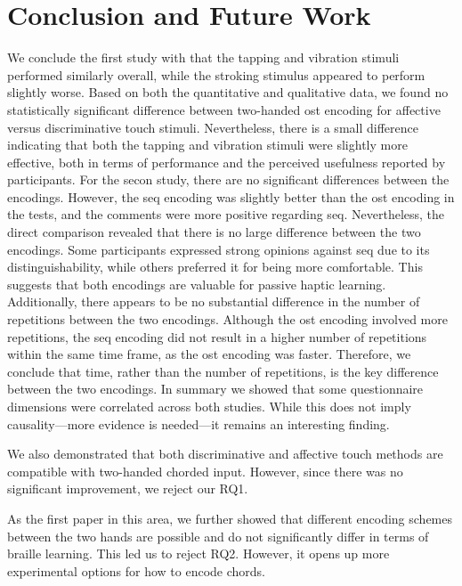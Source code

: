 \chapter{Conclusion and Future Work}
\label{ch:conclusion}

We conclude the first study with that the tapping and vibration stimuli performed similarly overall, while the stroking stimulus appeared to perform slightly worse. Based on both the quantitative and qualitative data, we found no statistically significant difference between two-handed \gls{ost} encoding for affective versus discriminative touch stimuli. Nevertheless, there is a small difference indicating that both the tapping and vibration stimuli were slightly more effective, both in terms of performance and the perceived usefulness reported by participants.
For the secon study, there are no significant differences between the encodings. However, the \gls{seq} encoding was slightly better than the \gls{ost} encoding in the tests, and the comments were more positive regarding \gls{seq}. Nevertheless, the direct comparison revealed that there is no large difference between the two encodings. Some participants expressed strong opinions against \gls{seq} due to its distinguishability, while others preferred it for being more comfortable. This suggests that both encodings are valuable for passive haptic learning. Additionally, there appears to be no substantial difference in the number of repetitions between the two encodings. Although the \gls{ost} encoding involved more repetitions, the \gls{seq} encoding did not result in a higher number of repetitions within the same time frame, as the \gls{ost} encoding was faster. Therefore, we conclude that time, rather than the number of repetitions, is the key difference between the two encodings.
In summary we showed that some questionnaire dimensions were correlated across both studies. While this does not imply causality—more evidence is needed—it remains an interesting finding.

We also demonstrated that both discriminative and affective touch methods are compatible with two-handed chorded input. However, since there was no significant improvement, we reject our RQ1.

As the first paper in this area, we further showed that different encoding schemes between the two hands are possible and do not significantly differ in terms of braille learning. This led us to reject RQ2. However, it opens up more experimental options for how to encode chords.

